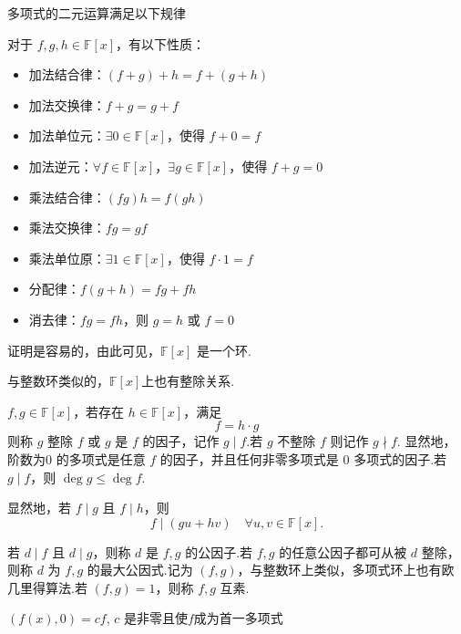 多项式的二元运算满足以下规律
\begin{proposition}
	对于 \( f, g, h \in \mathbb{F}[x] \)，有以下性质：
	
	\begin{itemize}
		\item[A1.] 加法结合律：\( (f + g) + h = f + (g + h) \)
		\item[A2.] 加法交换律：\( f + g = g + f \)
		\item[A3.] 加法单位元：\( \exists 0 \in \mathbb{F}[x] \)，使得 \( f + 0 = f \)
		\item[A4.] 加法逆元：\( \forall f \in \mathbb{F}[x] \)，\( \exists g \in \mathbb{F}[x] \)，使得 \( f + g = 0 \)
		\item[M1.] 乘法结合律：\( (fg)h = f(gh) \)
		\item[M2.] 乘法交换律：\( fg = gf \)
		\item[M3.] 乘法单位原：\( \exists 1 \in \mathbb{F}[x] \)，使得 \( f \cdot 1 = f \)
		\item[D1.] 分配律：\( f(g + h) = fg + fh \)
		\item[D2.] 消去律：\( fg = fh \)，则 \( g = h \) 或 \( f = 0 \)
	\end{itemize}

\end{proposition}
	
证明是容易的，由此可见，\( \mathbb{F}[x] \) 是一个环.

与整数环类似的，\( \mathbb{F}[x] \)上也有整除关系.
\begin{definition}
	\( f, g \in \mathbb{F}[x] \)，若存在 \( h \in \mathbb{F}[x] \)，满足
	\[ f = h \cdot g \]
	则称 \( g \) 整除 \( f \) 或 \( g \) 是 \( f \) 的因子，记作 \( g \mid f \).若 \( g \) 不整除 \( f \) 则记作 \( g \nmid f \).
	显然地，阶数为$0$ 的多项式是任意 \( f \) 的因子，并且任何非零多项式是 $0$ 多项式的因子.若 \( g \mid f \)，则 \( \deg g \leq \deg f \).
	
\end{definition}
显然地，若 \( f \mid g \) 且 \( f \mid h \)，则
\[ f \mid (gu + hv) \quad \forall u, v \in \mathbb{F}[x]. \]

若 \( d \mid f \) 且 \( d \mid g \)，则称 \( d \) 是 \( f, g \) 的公因子.若 \( f, g \) 的任意公因子都可从被 \( d \) 整除，则称 \( d \) 为 \( f, g \) 的最大公因式.记为 \( (f, g) \)，与整数环上类似，多项式环上也有欧几里得算法.若 \( (f, g) = 1 \)，则称 \( f, g \) 互素.

\( (f(x), 0) = cf \), \( c \) 是非零且使$f$成为首一多项式

